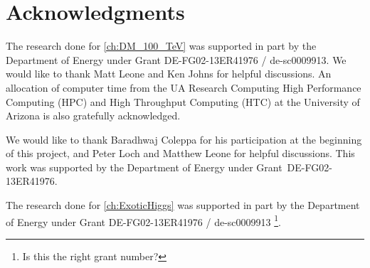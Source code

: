 \chapter*{Acknowledgments}

The research done for \autoref{ch:DM_100_TeV} was supported in part by the Department of Energy under Grant DE-FG02-13ER41976 / de-sc0009913. 
We would like to thank Matt Leone and Ken Johns for helpful discussions. An allocation of computer time from the UA Research Computing High Performance Computing (HPC) and High Throughput Computing (HTC) at the University of Arizona is also gratefully acknowledged.

We would like to thank Baradhwaj Coleppa for his participation at the beginning of this project, and Peter Loch and Matthew Leone for helpful discussions. This work was supported by the Department of Energy under Grant~DE-FG02-13ER41976.

The research done for \autoref{ch:ExoticHiggs} was supported in part by the Department of Energy under Grant DE-FG02-13ER41976 / de-sc0009913 \footnote{Is this the right grant number?}.
